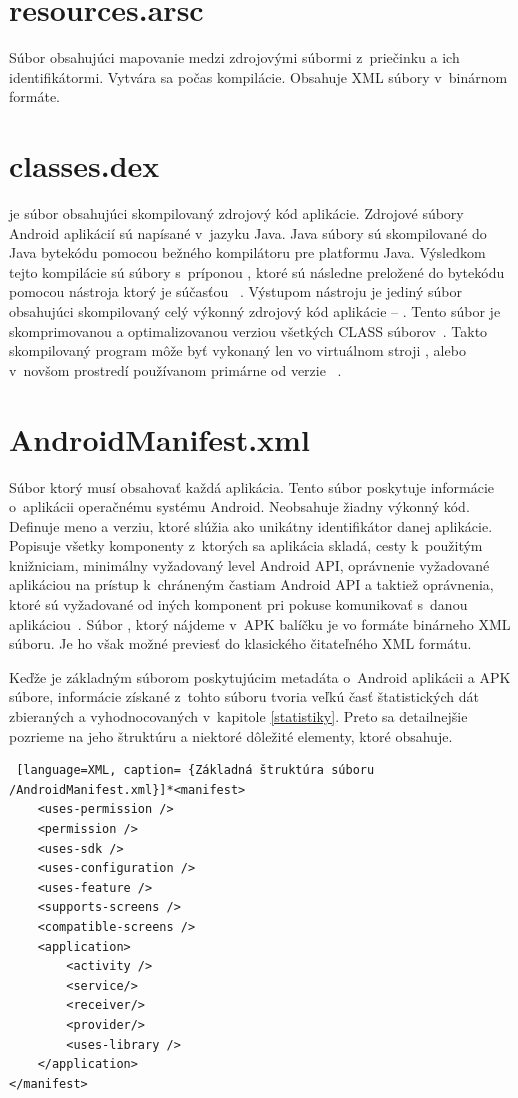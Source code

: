 \section{resources.arsc}
\label{resources.arsc}
Súbor obsahujúci mapovanie medzi zdrojovými súbormi  z~priečinku  a ich identifikátormi.  Vytvára sa počas kompilácie. Obsahuje XML súbory v~binárnom formáte.

\section{classes.dex}
\label{classes.dex}
 je súbor obsahujúci skompilovaný zdrojový kód aplikácie.  Zdrojové súbory Android aplikácií sú napísané v~jazyku Java. Java súbory sú skompilované do Java bytekódu pomocou bežného kompilátoru pre platformu Java. Výsledkom tejto kompilácie sú súbory s~príponou , ktoré sú následne preložené do  bytekódu pomocou nástroja  ktorý je súčasťou ~\cite{Reddy2014}. Výstupom nástroju  je jediný súbor obsahujúci skompilovaný celý výkonný zdrojový kód aplikácie -- . Tento súbor je skomprimovanou a optimalizovanou verziou všetkých CLASS súborov~\cite{Georgiev2014}. Takto skompilovaný program môže byť vykonaný len vo virtuálnom stroji , alebo v~novšom prostredí  používanom primárne od verzie ~\cite{dalvik}.

\section{AndroidManifest.xml} 
\label{AndroidManifest.xml}
Súbor ktorý musí obsahovať každá aplikácia. Tento súbor poskytuje informácie o~aplikácii operačnému systému Android. Neobsahuje žiadny výkonný kód. Definuje meno a verziu, ktoré slúžia ako unikátny identifikátor danej aplikácie. Popisuje všetky komponenty z~ktorých sa aplikácia skladá, cesty k~použitým knižniciam, minimálny vyžadovaný level Android API, oprávnenie vyžadované aplikáciou na prístup k~chráneným častiam Android API a taktiež oprávnenia, ktoré sú vyžadované od iných komponent pri pokuse komunikovať s~danou aplikáciou~\cite{appManifest}. Súbor , ktorý nájdeme v~APK balíčku je vo formáte binárneho XML súboru. Je ho však možné previesť do klasického čitateľného XML formátu.

Keďže  je základným súborom poskytujúcim metadáta o~Android aplikácii a APK súbore, informácie získané z~tohto súboru tvoria veľkú časť štatistických dát zbieraných a vyhodnocovaných v~kapitole \ref{statistiky}. Preto sa detailnejšie pozrieme na jeho štruktúru a niektoré dôležité elementy, ktoré obsahuje.
\begin{lstlisting} [language=XML, caption= {Základná štruktúra súboru /AndroidManifest.xml}]*<manifest>
    <uses-permission />
    <permission />
    <uses-sdk />
    <uses-configuration />  
    <uses-feature />  
    <supports-screens />  
    <compatible-screens />  
    <application>
        <activity />
        <service/>
        <receiver/>
        <provider/>
        <uses-library />
    </application>
</manifest>
\end{lstlisting}

